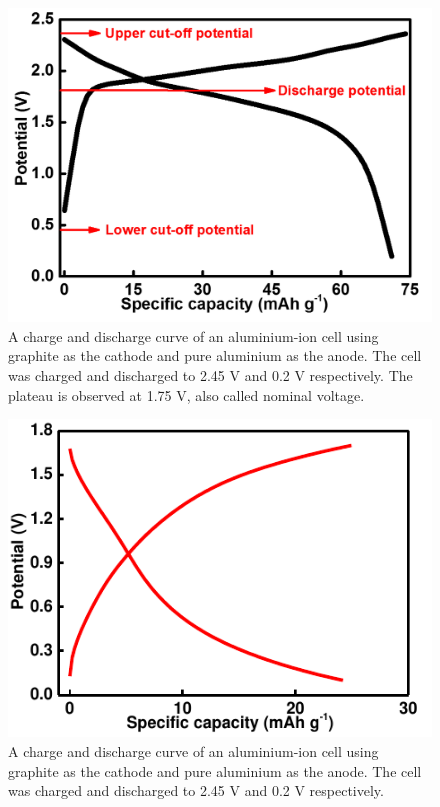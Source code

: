 \begin{itemize}
\begin{figure}[h!]
\centering
\includegraphics[width=\textwidth]{Figures/chap1fig/CDCforcellvoltage}
\caption{A charge and discharge curve of an aluminium-ion cell using graphite as the cathode and pure aluminium as the anode. The cell was charged and discharged to 2.45 V and 0.2 V respectively. The plateau is observed at 1.75 V, also called nominal voltage.}
\label{Figures/chap1fig:CDCforcellvoltage}
\end{figure}

\begin{figure}[tbh!]
\centering
\includegraphics[width=\textwidth]{Figures/chap1fig/batpot.pdf}
\caption{A charge and discharge curve of an aluminium-ion cell using graphite as the cathode and pure aluminium as the anode. The cell was charged and discharged to 2.45 V and 0.2 V respectively.}
\label{Figures/chap1fig:batpot}
\end{figure}


\end{itemize}
